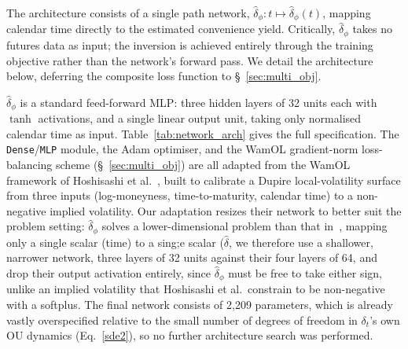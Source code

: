 \documentclass[11pt, a4paper]{article}
\begin{document}
The architecture consists of a single path network, $\hat{\delta}_\phi: t \mapsto \hat{\delta}_\phi(t)$, mapping calendar time directly to the estimated convenience yield. Critically, $\hat{\delta}_\phi$ takes no futures data as input; the inversion is achieved entirely through the training objective rather than the network's forward pass. We detail the architecture below, deferring the composite loss function to \S~\ref{sec:multi_obj}.

$\hat{\delta}_\phi$ is a standard feed-forward MLP: three hidden layers of 32 units each with $\tanh$ activations, and a single linear output unit, taking only normalised calendar time as input. Table~\ref{tab:network_arch} gives the full specification. The \texttt{Dense}/\texttt{MLP} module, the Adam optimiser, and the WamOL gradient-norm loss-balancing scheme (\S~\ref{sec:multi_obj}) are all adapted from the WamOL framework of Hoshisashi et al.~\cite{Hoshisashi2024Physics-InformedPDEs, Hoshisashi2024Whack-a-moleSurface}, built to calibrate a Dupire local-volatility surface from three inputs (log-moneyness, time-to-maturity, calendar time) to a non-negative implied volatility. Our adaptation resizes their network to better suit the problem setting: $\hat{\delta}_\phi$ solves a lower-dimensional problem than that in~\cite{Hoshisashi2024Whack-a-moleSurface}, mapping only a single scalar (time) to a sing;e scalar ($\hat{\delta}$, we therefore use a shallower, narrower network, three layers of 32 units against their four layers of 64, and drop their output activation entirely, since $\hat{\delta}_\phi$ must be free to take either sign, unlike an implied volatility that Hoshisashi et al.\ constrain to be non-negative with a softplus. The final network consists of 2{,}209 parameters, which is already vastly overspecified relative to the small number of degrees of freedom in $\delta_t$'s own OU dynamics (Eq.~\ref{sde2}), so no further architecture search was performed.
\end{document}
